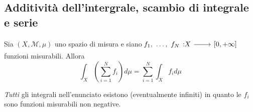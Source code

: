\subsection{Additività dell'intergrale, scambio di integrale e serie}
\begin{proposition}
	Sia $\left(X,\mathcal{M},\mu\right)$ uno spazio di misura e siano $\funz{f_1,\ \ldots,\ f_N}{X}{\left[0,+\infty\right]}$ funzioni misurabili. Allora
	\begin{equation}
		\int_X \left(\sum_{i=1}^{N}f_i\right)d\mu=\sum_{i=1}^{N}\int_Xf_id\mu
	\end{equation}
\end{proposition}
\begin{observe}
	\textit{Tutti} gli integrali nell'enunciato esistono (eventualmente infiniti) in quanto le $f_i$ sono funzioni misurabili non negative.
\end{observe}
